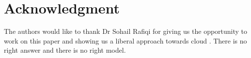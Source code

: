 \documentclass[journal]{hybrid-cloud}
\begin{document}
\section*{Acknowledgment}


The authors would like to thank Dr Sohail Rafiqi for giving us the opportunity to work on this paper and showing us a liberal approach towards cloud . There is no right answer and there is no right model. 

\ifCLASSOPTIONcaptionsoff
  \newpage
\fi









%
%
%














% 
\end{document}
